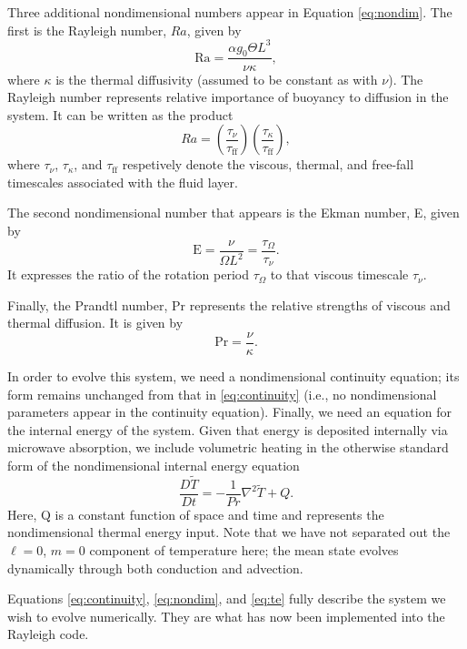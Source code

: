 Three additional nondimensional numbers appear in Equation \ref{eq:nondim}.  The first is the Rayleigh number, $Ra$, given by
\begin{equation}
\mathrm{Ra} = \frac{\alpha g_0 \Theta L^3}{\nu\kappa},
\end{equation}
where $\kappa$ is the thermal diffusivity (assumed to be constant as with $\nu$).  The Rayleigh number represents 
relative importance of buoyancy to diffusion in the system.  It can be written as the product
\begin{equation}
Ra=\left(\frac{\tau_{\nu}}{\tau_{\mathrm{ff}}}\right)\left(\frac{\tau_{\kappa}}{\tau_{\mathrm{ff}}}\right),
\end{equation} 
where $\tau_{\nu}$, $\tau_{\kappa}$, and $\tau_{\mathrm{ff}}$ respetively denote the viscous, thermal, and free-fall timescales associated with the fluid layer.

The second nondimensional number that appears is the Ekman number, E, given by
\begin{equation}
\mathrm{E} = \frac{\nu}{\Omega L^2} = \frac{\tau_\Omega}{\tau_\nu}.
\end{equation}
It expresses the ratio of the rotation period $\tau_\Omega$ to that viscous timescale $\tau_\nu$.

Finally, the Prandtl number, Pr represents the relative strengths of viscous and thermal diffusion.  It is given by
\begin{equation}
\mathrm{Pr} = \frac{\nu}{\kappa}.
\end{equation}

In order to evolve this system, we need a nondimensional continuity equation;  its form remains unchanged from that in \ref{eq:continuity} (i.e.,  no nondimensional parameters appear in the continuity equation).  Finally, we need an equation for the internal energy of the system.  Given that energy is deposited internally via microwave absorption, we include volumetric heating in the otherwise standard form of the nondimensional internal energy equation
\begin{equation}
\label{eq:te}
\frac{D\tilde{T}}{Dt}=-\frac{1}{Pr}\nabla^2\tilde{T} + Q.
\end{equation}
Here, Q is a constant function of space and time and represents the nondimensional thermal energy input.  Note that we have not separated out the $\ell=0$, $m=0$ component of temperature here;  the mean state evolves dynamically through both conduction and advection.

Equations \ref{eq:continuity}, \ref{eq:nondim}, and \ref{eq:te}  fully describe the system we wish to evolve numerically.  They are what has now been implemented into the Rayleigh code.

